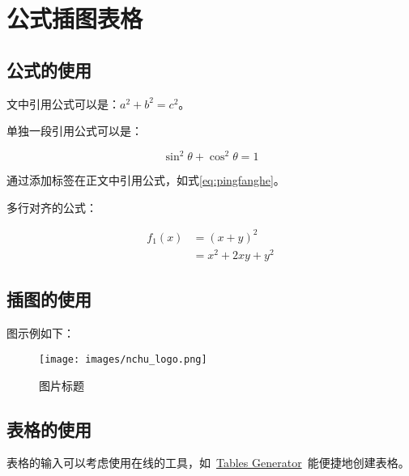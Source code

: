 %
%
%


\chapter{公式插图表格}

\section{公式的使用}

文中引用公式可以是：$a^2+b^2=c^2$。

单独一段引用公式可以是：

\begin{equation}
    \sin^2{\theta}+\cos^2{\theta}=1 \label{eq:pingfanghe}
\end{equation}

通过添加标签在正文中引用公式，如式\eqref{eq:pingfanghe}。

多行对齐的公式：

\begin{equation}
  \begin{aligned}
    f_1(x)&=(x+y)^2\\
          &=x^2+2xy+y^2
  \end{aligned}
\end{equation}

\section{插图的使用}

图示例如下：

\begin{figure}[htbp]
	\begin{center}
	    \vspace{13pt} %
		\texttt{[image: images/nchu\_logo.png]}
		\caption{图片标题} 
		\label{图片标题序号} %
	\end{center}
\end{figure}

\section{表格的使用}

表格的输入可以考虑使用在线的工具，如~\href{https://www.tablesgenerator.com/}{Tables Generator}~能便捷地创建表格。

